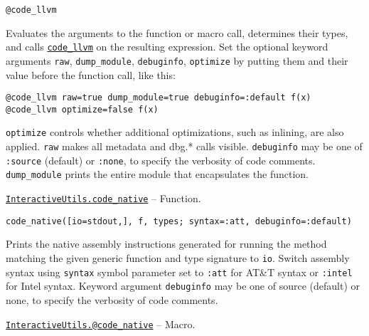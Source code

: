 \begin{adjustwidth}{2em}{0pt}


\begin{verbatim}
@code_llvm
\end{verbatim}

Evaluates the arguments to the function or macro call, determines their types, and calls \hyperlink{1749471484368489435}{\texttt{code\_llvm}} on the resulting expression. Set the optional keyword arguments \texttt{raw}, \texttt{dump\_module}, \texttt{debuginfo}, \texttt{optimize} by putting them and their value before the function call, like this:


\begin{lstlisting}
@code_llvm raw=true dump_module=true debuginfo=:default f(x)
@code_llvm optimize=false f(x)
\end{lstlisting}

\texttt{optimize} controls whether additional optimizations, such as inlining, are also applied. \texttt{raw} makes all metadata and dbg.* calls visible. \texttt{debuginfo} may be one of \texttt{:source} (default) or \texttt{:none},  to specify the verbosity of code comments. \texttt{dump\_module} prints the entire module that encapsulates the function.



\end{adjustwidth}
\hypertarget{2534314152947301270}{}
\hyperlink{2534314152947301270}{\texttt{InteractiveUtils.code\_native}}  -- {Function.}

\begin{adjustwidth}{2em}{0pt}


\begin{verbatim}
code_native([io=stdout,], f, types; syntax=:att, debuginfo=:default)
\end{verbatim}

Prints the native assembly instructions generated for running the method matching the given generic function and type signature to \texttt{io}. Switch assembly syntax using \texttt{syntax} symbol parameter set to \texttt{:att} for AT\&T syntax or \texttt{:intel} for Intel syntax. Keyword argument \texttt{debuginfo} may be one of source (default) or none, to specify the verbosity of code comments.



\end{adjustwidth}
\hypertarget{2629340111434042067}{}
\hyperlink{2629340111434042067}{\texttt{InteractiveUtils.@code\_native}}  -- {Macro.}

